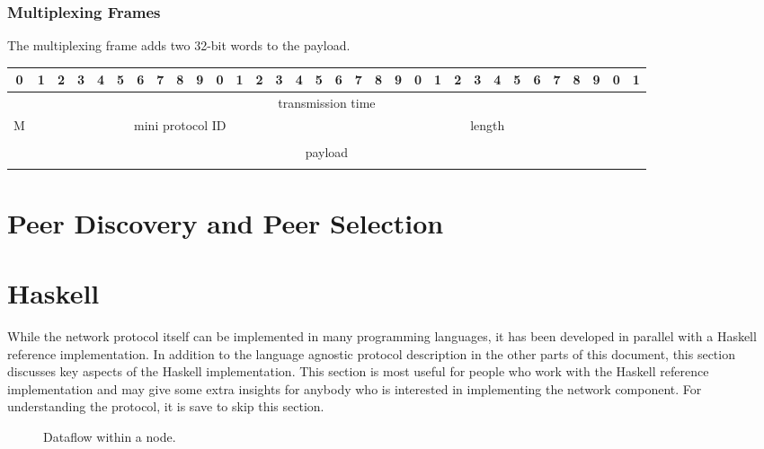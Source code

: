 \documentclass{report}
\newcommand{\wip}[1]{\color{magenta}{#1}\color{black}}
\theoremstyle{definition}{
  \newtheorem{lemma}{Lemma}[section] %
  \newtheorem{definition}[lemma]{Definition}
}
\theoremstyle{theorem}{
  \newtheorem{invariant}[lemma]{Invariant}
  \newtheorem{proofobligation}[lemma]{Proof Obligation}
}
\numberwithin{equation}{lemma}
\begin{document}
\subsection{Multiplexing Frames}
The multiplexing frame adds two 32-bit words to the payload.

\begingroup
\setlength{\tabcolsep}{3pt}
\begin{tabular}{|c|c|c|c|c|c|c|c|c|c|c|c|c|c|c|c|c|c|c|c|c|c|c|c|c|c|c|c|c|c|c|c|}
  \hline
  0&1&2&3&4&5&6&7&8&9&0&1&2&3&4&5&6&7&8&9&0&1&2&3&4&5&6&7&8&9&0&1 \\ \hline
  \multicolumn{32}{|c|}{transmission time} \\ \hline
  \multicolumn{1}{|c|}{M}
  &\multicolumn{15}{|c|}{mini protocol ID}
  &\multicolumn{16}{|c|}{length} \\ \hline
  \multicolumn{32}{|c|}{} \\
  \multicolumn{32}{|c|}{payload} \\
  \multicolumn{32}{|c|}{} \\ \hline
\end{tabular}
\endgroup

\chapter{Peer Discovery and Peer Selection}
\wip{
  Peer discovery and peer selection are relatively independent for the core components of a node.
  In a first iteration, it may be enough to specify what data is going from
  the peer selection algorithm to
  the core components and what data is going from the core components to the peer selection.
  Also peer discovery and peer selection are relatively independent from each other.
  }

\chapter{Haskell}
While the network protocol itself can be implemented in many programming languages,
it has been developed in parallel with a Haskell reference implementation.
In addition to the language agnostic protocol description in the other parts of this document,
this section discusses key aspects of the Haskell implementation.
This section is most useful for people who work with the Haskell reference implementation and
may give some extra insights for anybody who is interested in implementing the
network component.
For understanding the protocol, it is save to skip this section.
\begin{figure}
\begin{center}
\end{center}
\caption{Dataflow within a node.}
\label{node-diagram-concurency}
\end{figure}
\end{document}
